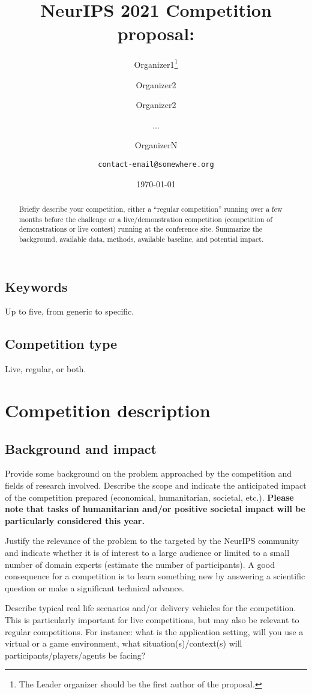 \documentclass[11pt, oneside]{article}
\title{NeurIPS 2021 Competition proposal:}
\author{Organizer1\thanks{The Leader organizer should be the first author of the proposal.} \and Organizer2 \and Organizer2 \and ... \and OrganizerN \\ \and
{\tt contact-email@somewhere.org}\\
}
\date{\today}
\begin{document}
\maketitle

\begin{abstract}
Briefly describe your competition, either a ``regular competition'' running over a few months before the challenge or a live/demonstration competition (competition of demonstrations or live contest) running at the conference site.
Summarize the background, available data, methods, available baseline, and potential impact.
\end{abstract}

\subsection*{Keywords}
Up to five, from generic to specific.
\subsection*{Competition type} Live, regular, or both.


\section{Competition description}

\subsection{Background and impact}

Provide some background on the problem approached by the competition and fields of research involved. Describe the scope and indicate the anticipated impact of the competition prepared (economical, humanitarian, societal, etc.). \textbf{Please note that tasks of humanitarian and/or positive societal impact will be particularly considered this year.}


Justify the relevance of the problem to the targeted by the NeurIPS community and indicate whether it is of interest to a large audience or limited to a small number of domain experts (estimate the number of participants). A good consequence for a competition is to learn something new by answering a scientific question or make a significant technical advance.

Describe typical real life scenarios and/or delivery vehicles for the competition. This is particularly important for live competitions, but may also be relevant to regular competitions. For instance: what is the application setting, will you use a virtual or a game environment, what situation(s)/context(s) will participants/players/agents be facing?
\end{document}
